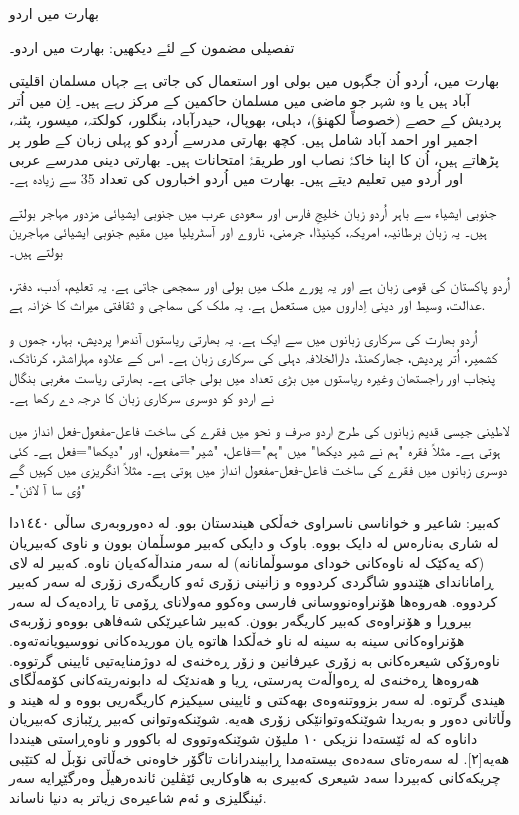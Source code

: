 \documentclass[a4paper]{article}
\begin{document}
بھارت میں اردو

تفصیلی مضمون کے لئے دیکھیں: بھارت میں اردو۔

بھارت میں، اُردو اُن جگہوں میں بولی اور استعمال کی جاتی ہے جہاں مسلمان اقلیتی آباد ہیں یا وہ شہر جو ماضی میں مسلمان حاکمین کے مرکز رہے ہیں۔ اِن میں اُتر پردیش کے حصے (خصوصاً لکھنؤ)، دہلی، بھوپال، حیدرآباد، بنگلور، کولکتہ، میسور، پٹنہ، اجمیر اور احمد آباد شامل ہیں. کچھ بھارتی مدرسے اُردو کو پہلی زبان کے طور پر پڑھاتے ہیں، اُن کا اپنا خاکۂ نصاب اور طریقۂ امتحانات ہیں۔ بھارتی دینی مدرسے عربی اور اُردو میں تعلیم دیتے ہیں۔ بھارت میں اُردو اخباروں کی تعداد 35 سے زیادہ ہے۔

جنوبی ایشیاء سے باہر اُردو زبان خلیجِ فارس اور سعودی عرب میں جنوبی ایشیائی مزدور مہاجر بولتے ہیں۔ یہ زبان برطانیہ، امریکہ، کینیڈا، جرمنی، ناروے اور آسٹریلیا میں مقیم جنوبی ایشیائی مہاجرین بولتے ہیں۔

اُردو پاکستان کی قومی زبان ہے اور یہ پورے ملک میں بولی اور سمجھی جاتی ہے. یہ تعلیم، اَدب، دفتر، عدالت، وسیط اور دینی اِداروں میں مستعمل ہے. یہ ملک کی سماجی و ثقافتی میراث کا خزانہ ہے.

اُردو بھارت کی سرکاری زبانوں میں سے ایک ہے. یہ بھارتی ریاستوں آندھرا پردیش، بہار، جموں و کشمیر، اُتر پردیش، جھارکھنڈ، دارالخلافہ دہلی کی سرکاری زبان ہے۔ اس کے علاوہ مہاراشٹر، کرناٹک، پنجاب اور راجستھان وغیرہ ریاستوں میں بڑی تعداد میں بولی جاتی ہے۔ بھارتی ریاست مغربی بنگال نے اردو کو دوسری سرکاری زبان کا درجہ دے رکھا ہے۔

لاطینی جیسی قدیم زبانوں کی طرح اردو صرف و نحو میں فقرے کی ساخت فاعل-مفعول-فعل انداز میں ہوتی ہے۔ مثلاً فقرہ "ہم نے شیر دیکھا" میں "ہم"=فاعل، "شیر"=مفعول، اور "دیکھا"=فعل ہے۔ کئی دوسری زبانوں میں فقرے کی ساخت فاعل-فعل-مفعول انداز میں ہوتی ہے۔ مثلاً انگریزی میں کہیں گے "وُی سا آ لائن"۔

کەبیر: شاعیر و خواناسی ناسراوی خەڵکی ھیندستان بوو. لە دەوروبەری ساڵی ١٤٤٠دا لە شاری بەنارەس لە دایک بووە. باوک و دایکی کەبیر موسڵمان بوون و ناوی کەبیریان (کە یەکێک لە ناوەکانی خودای موسوڵمانانە) لە سەر منداڵەکەیان ناوە. کەبیر لە لای ڕاماناندای ھێندوو شاگردی کردووە و زانینی زۆری ئەو کاریگەری زۆری لە سەر کەبیر کردووە. ھەروەھا ھۆنراوەنووسانی فارسی وەکوو مەولانای ڕۆمی تا ڕادەیەک لە سەر بیروڕا و ھۆنراوەی کەبیر کاریگەر بوون. کەبیر شاعیرێکی شەفاھی بووەو زۆربەی ھۆنراوەکانی سینە بە سینە لە ناو خەڵکدا ھاتوە یان موریدەکانی نووسیویانەتەوە. ناوەرۆکی شیعرەکانی بە زۆری عیرفانین و زۆر ڕەخنەی لە دوژمنایەتیی ئایینی گرتووە. ھەروەھا ڕەخنەی لە ڕەواڵەت پەرستی، ڕیا و ھەندێک لە دابونەریتەکانی کۆمەڵگای ھیندی گرتوە. لە سەر بزووتنەوەی بھەکتی و ئایینی سیکیزم کاریگەریی بووە و لە ھیند و وڵاتانی دەور و بەریدا شوێنکەوتوانێکی زۆری ھەیە. شوێنکەوتوانی کەبیر ڕێبازی کەبیریان داناوە کە لە ئێستەدا نزیکی ١٠ ملیۆن شوێنکەوتووی لە باکوور و ناوەڕاستی ھینددا ھەیە[٢]. لە سەرەتای سەدەی بیستەمدا ڕابیندرانات تاگۆر خاوەنی خەڵاتی نۆبڵ لە کتێبی چریکەکانی کەبیردا سەد شیعری کەبیری بە ھاوکاریی ئێڤلین ئاندەرھیڵ وەرگێڕایە سەر ئینگلیزی و ئەم شاعیرەی زیاتر بە دنیا ناساند.
\end{document}
